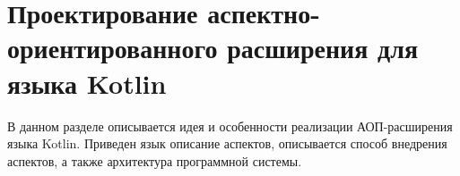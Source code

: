 \chapter{Проектирование аспектно-ориентированного расширения для языка Kotlin}
\label{ch:extension_design}
В данном разделе описывается идея и особенности реализации АОП-расширения языка Kotlin.
Приведен язык описание аспектов, описывается способ внедрения аспектов, а также архитектура программной системы.


